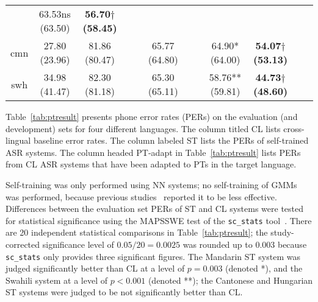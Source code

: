 \begin{table*}[t]
{\begin{tabular}{| c || c | c c c | c c c | c | c c c |}
    & 63.53ns (63.50)
    &   \textbf{56.70$\dagger$ (58.45)} &&
    \\
    cmn & 27.80 (23.96)
    & 81.86 (80.47) &&
    & 65.77 (64.80) &&
    & 64.90* (64.00)
    &   \textbf{54.07$\dagger$ (53.13)} &&
    \\
    swh & 34.98 (41.47)
    & 82.30 (81.18) &&
    & 65.30 (65.11) &&
    & 58.76** (59.81)
    &   \textbf{44.73$\dagger$ (48.60)} &&
    \\\hline
\end{tabular}}
\vspace*{1mm}
\caption{\label{tab:ptresult} PERs on the evaluation and development sets (development in parentheses) before and after adaptation with PTs.  ML=Maximum Likelihood, sMBR=Structural Minimum Bayes Risk.  MAPSSWE significance testing with respect to CL acoustic model with text-based language model: * means $p\le 0.003$, ** means $p<0.001$, ns means not significant. $\dagger$ denotes a score lower than both CL and ST baselines at $p<0.001$.}
\end{table*}


Table~\ref{tab:ptresult} presents phone error rates (PERs) on the
evaluation (and development) sets for four different languages. The
column titled {\sc CL} lists cross-lingual baseline error rates.
The column labeled {\sc ST} lists the
PERs of self-trained ASR systems.
The column headed {\sc PT-adapt} in Table~\ref{tab:ptresult} lists
PERs from {\sc CL} ASR systems that have been adapted to PTs in the target
language.

Self-training was only performed
using NN systems; no self-training of GMMs was performed, because
previous studies~\cite{Huang2013} reported it to be less effective.
Differences between the evaluation set PERs of {\sc ST} and {\sc CL}
systems were tested for statistical significance using the MAPSSWE
test of the {\tt sc\_stats} tool~\cite{Pallet90}.  There are 20
independent statistical comparisons in Table~\ref{tab:ptresult}; the
study-corrected significance level of $0.05/20=0.0025$ was rounded up
to $0.003$ because {\tt sc\_stats} only provides three significant
figures.  The Mandarin {\sc ST} system was judged significantly better
than {\sc CL} at a level of $p=0.003$ (denoted *), and the Swahili
system at a level of $p<0.001$ (denoted **); the Cantonese and
Hungarian {\sc ST} systems were judged to be not significantly better
than {\sc CL}.

